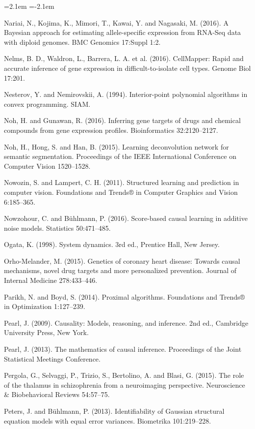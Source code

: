 \begin{list}{}{\leftmargin=2.1em  
  \itemindent=-2.1em \parsep=0pt \itemsep=2pt \topsep=0pt}
\item Nariai, N., Kojima, K., Mimori, T., Kawai, Y. and Nagasaki, M. (2016). A Bayesian approach for estimating allele-specific expression from RNA-Seq data with diploid genomes. BMC Genomics 17:Suppl 1:2.
\item Nelms, B. D., Waldron, L., Barrera, L. A. et al. (2016). CellMapper: Rapid and accurate inference of gene expression in difficult-to-isolate cell types. Genome Biol 17:201.
\item Nesterov, Y. and Nemirovskii, A. (1994). Interior-point polynomial algorithms in convex programming. SIAM.
\item Noh, H. and Gunawan, R. (2016). Inferring gene targets of drugs and chemical compounds from gene expression profiles. Bioinformatics 32:2120--2127.
\item Noh, H., Hong, S. and Han, B. (2015). Learning deconvolution network for semantic segmentation. Proceedings of the IEEE International Conference on Computer Vision 1520--1528.
\item Nowozin, S. and Lampert, C. H. (2011). Structured learning and prediction in computer vision. Foundations and Trends® in Computer Graphics and Vision 6:185--365.
\item Nowzohour, C. and Bühlmann, P. (2016). Score-based causal learning in additive noise models. Statistics 50:471--485.
\item Ogata, K. (1998). System dynamics. 3rd ed., Prentice Hall, New Jersey.
\item Orho-Melander, M. (2015). Genetics of coronary heart disease: Towards causal mechanisms, novel drug targets and more personalized prevention. Journal of Internal Medicine 278:433--446.
\item Parikh, N. and Boyd, S. (2014). Proximal algorithms. Foundations and Trends® in Optimization 1:127--239.
\item Pearl, J. (2009). Causality: Models, reasoning, and inference. 2nd ed., Cambridge University Press, New York.
\item Pearl, J. (2013). The mathematics of causal inference. Proceedings of the Joint Statistical Meetings Conference.
\item Pergola, G., Selvaggi, P., Trizio, S., Bertolino, A. and Blasi, G. (2015). The role of the thalamus in schizophrenia from a neuroimaging perspective. Neuroscience \& Biobehavioral Reviews 54:57--75.
\item Peters, J. and Bühlmann, P. (2013). Identifiability of Gaussian structural equation models with equal error variances. Biometrika 101:219--228.

\end{list}
